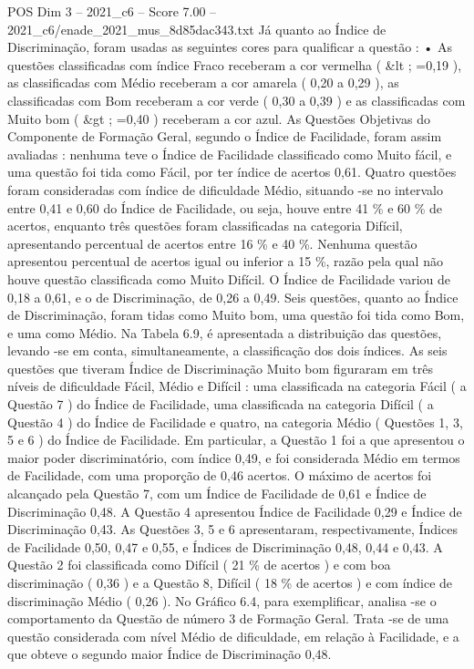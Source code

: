 \begin{textsample}{POS Dim 3 – 2021\_c6 – Score 7.00 – 2021\_c6/enade\_2021\_mus\_8d85dac343.txt}
Já quanto ao Índice de Discriminação, foram usadas as seguintes cores para qualificar a questão : • As questões classificadas com índice Fraco receberam a cor vermelha ( \&lt ; =0,19 ), as classificadas com Médio receberam a cor amarela ( 0,20 a 0,29 ), as classificadas com Bom receberam a cor verde ( 0,30 a 0,39 ) e as classificadas com Muito bom ( \&gt ; =0,40 ) receberam a cor azul.
As Questões Objetivas do Componente de Formação Geral, segundo o Índice de Facilidade, foram assim avaliadas : nenhuma teve o Índice de Facilidade classificado como Muito fácil, e uma questão foi tida como Fácil, por ter índice de acertos 0,61.
Quatro questões foram consideradas com índice de dificuldade Médio, situando -se no intervalo entre 0,41 e 0,60 do Índice de Facilidade, ou seja, houve entre 41 \% e 60 \% de acertos, enquanto três questões foram classificadas na categoria Difícil, apresentando percentual de acertos entre 16 \% e 40 \%.
Nenhuma questão apresentou percentual de acertos igual ou inferior a 15 \%, razão pela qual não houve questão classificada como Muito Difícil.
O Índice de Facilidade variou de 0,18 a 0,61, e o de Discriminação, de 0,26 a 0,49.
Seis questões, quanto ao Índice de Discriminação, foram tidas como Muito bom, uma questão foi tida como Bom, e uma como Médio.
Na Tabela 6.9, é apresentada a distribuição das questões, levando -se em conta, simultaneamente, a classificação dos dois índices.
As seis questões que tiveram Índice de Discriminação Muito bom figuraram em três níveis de dificuldade Fácil, Médio e Difícil : uma classificada na categoria Fácil ( a Questão 7 ) do Índice de Facilidade, uma classificada na categoria Difícil ( a Questão 4 ) do Índice de Facilidade e quatro, na categoria Médio ( Questões 1, 3, 5 e 6 ) do Índice de Facilidade.
Em particular, a Questão 1 foi a que apresentou o maior poder discriminatório, com índice 0,49, e foi considerada Médio em termos de Facilidade, com uma proporção de 0,46 acertos.
O máximo de acertos foi alcançado pela Questão 7, com um Índice de Facilidade de 0,61 e Índice de Discriminação 0,48.
A Questão 4 apresentou Índice de Facilidade 0,29 e Índice de Discriminação 0,43.
As Questões 3, 5 e 6 apresentaram, respectivamente, Índices de Facilidade 0,50, 0,47 e 0,55, e Índices de Discriminação 0,48, 0,44 e 0,43.
A Questão 2 foi classificada como Difícil ( 21 \% de acertos ) e com boa discriminação ( 0,36 ) e a Questão 8, Difícil ( 18 \% de acertos ) e com índice de discriminação Médio ( 0,26 ).
No Gráfico 6.4, para exemplificar, analisa -se o comportamento da Questão de número 3 de Formação Geral.
Trata -se de uma questão considerada com nível Médio de dificuldade, em relação à Facilidade, e a que obteve o segundo maior Índice de Discriminação 0,48.

\end{textsample}
